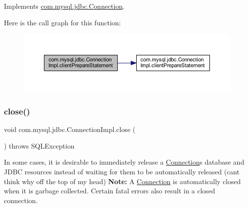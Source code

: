 Implements \mbox{\hyperlink{interfacecom_1_1mysql_1_1jdbc_1_1_connection_af2c3e5b2cd7768c4fdf7ca4e75558bbf}{com.\+mysql.\+jdbc.\+Connection}}.

Here is the call graph for this function\+:\nopagebreak
\begin{figure}[H]
\begin{center}
\leavevmode
\includegraphics[width=350pt]{classcom_1_1mysql_1_1jdbc_1_1_connection_impl_ab4f506b0ae8623a91e4aea7f33bb2da5_cgraph}
\end{center}
\end{figure}
\mbox{\label{classcom_1_1mysql_1_1jdbc_1_1_connection_impl_a9499cd266206c66001685b386c6a6b43}} 
\subsubsection{\texorpdfstring{close()}{close()}}
{\footnotesize\ttfamily void com.\+mysql.\+jdbc.\+Connection\+Impl.\+close (\begin{DoxyParamCaption}{ }\end{DoxyParamCaption}) throws S\+Q\+L\+Exception}

In some cases, it is desirable to immediately release a \mbox{\hyperlink{interfacecom_1_1mysql_1_1jdbc_1_1_connection}{Connection}}\textquotesingle{}s database and J\+D\+BC resources instead of waiting for them to be automatically released (cant think why off the top of my head) {\bfseries Note\+:} A \mbox{\hyperlink{interfacecom_1_1mysql_1_1jdbc_1_1_connection}{Connection}} is automatically closed when it is garbage collected. Certain fatal errors also result in a closed connection.


